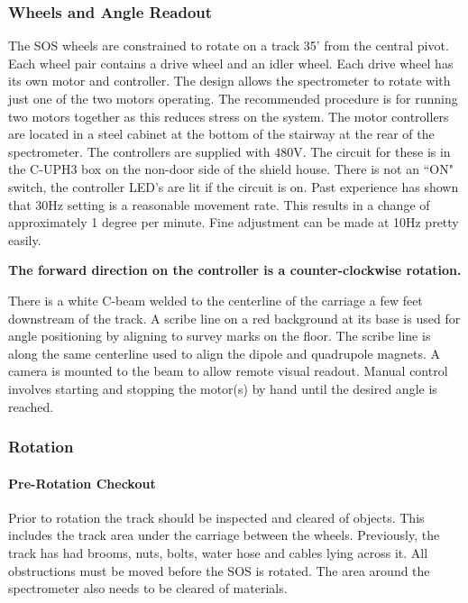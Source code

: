 \subsubsection{Wheels and Angle Readout}

The SOS wheels are constrained to rotate on a track 35' from the central
pivot. Each wheel pair contains a drive wheel and an idler wheel. Each
drive wheel has its own motor and controller. The design allows the
spectrometer to rotate with just one of the two motors operating. The
recommended procedure is for running two motors together as this reduces stress
on the system. The motor controllers are located in a steel cabinet at the
bottom of the stairway at the rear of the spectrometer. The controllers are
supplied with 480V. The circuit for these is in the C-UPH3 box on the non-door
side of the shield house. There is not an ``ON" switch, the controller LED's
are lit if the circuit is on. Past experience has shown that 30Hz setting is a
reasonable movement rate. This results in a change of approximately 1
degree per minute. Fine adjustment can be made at 10Hz pretty easily.

{\bf The forward direction on the controller is a counter-clockwise rotation.}

There is a white C-beam welded to the centerline of the carriage a few feet
downstream of the track. A scribe line on a red background at its base is
used for angle positioning by aligning to survey marks on the floor. The
scribe line is along the same centerline used to align the dipole and quadrupole
magnets. A camera is mounted to the beam to allow
remote visual readout. Manual control involves starting and stopping the
motor(s) by hand until the desired angle is reached.

\subsubsection{Rotation}

\paragraph{Pre-Rotation Checkout}

Prior to rotation the track should be inspected and cleared of objects. This
includes the track area under the carriage between the wheels. Previously,
the track has had brooms, nuts, bolts, water hose and cables lying across it.
All obstructions must be moved before the SOS is rotated.
The area around the spectrometer also needs to be cleared of materials.

